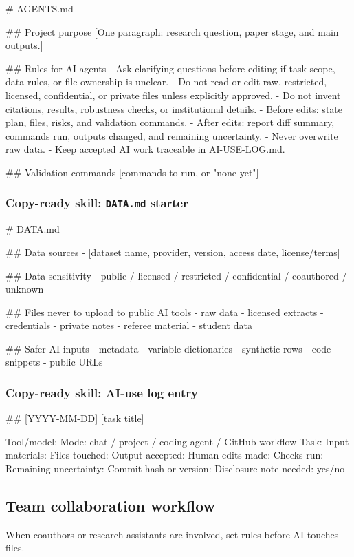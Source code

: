 \documentclass[11pt]{article}
\newcommand{\skill}[1]{\subsubsection*{Copy-ready skill: #1}}
\begin{document}
\begin{promptblock}
# AGENTS.md

## Project purpose
[One paragraph: research question, paper stage, and main outputs.]

## Rules for AI agents
- Ask clarifying questions before editing if task scope, data rules, or file ownership is unclear.
- Do not read or edit raw, restricted, licensed, confidential, or private files unless explicitly approved.
- Do not invent citations, results, robustness checks, or institutional details.
- Before edits: state plan, files, risks, and validation commands.
- After edits: report diff summary, commands run, outputs changed, and remaining uncertainty.
- Never overwrite raw data.
- Keep accepted AI work traceable in AI-USE-LOG.md.

## Validation commands
[commands to run, or "none yet"]
\end{promptblock}

\skill{\texttt{DATA.md} starter}

\begin{promptblock}
# DATA.md

## Data sources
- [dataset name, provider, version, access date, license/terms]

## Data sensitivity
- public / licensed / restricted / confidential / coauthored / unknown

## Files never to upload to public AI tools
- raw data
- licensed extracts
- credentials
- private notes
- referee material
- student data

## Safer AI inputs
- metadata
- variable dictionaries
- synthetic rows
- code snippets
- public URLs
\end{promptblock}

\skill{AI-use log entry}

\begin{promptblock}
## [YYYY-MM-DD] [task title]

Tool/model:
Mode: chat / project / coding agent / GitHub workflow
Task:
Input materials:
Files touched:
Output accepted:
Human edits made:
Checks run:
Remaining uncertainty:
Commit hash or version:
Disclosure note needed: yes/no
\end{promptblock}

\subsection{Team collaboration workflow}

When coauthors or research assistants are involved, set rules before AI touches files.
\end{document}
